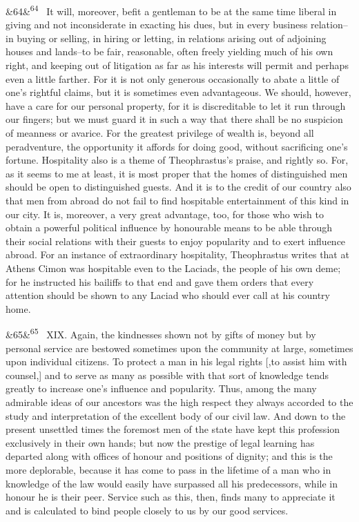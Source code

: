 \documentclass[12pt]{article}
\newcommand{\para}[1][]{\par\noindent\ifx&#1&\else\textsuperscript{\footnotesize #1}~\fi}
\begin{document}
\para[64] It will, moreover, befit a gentleman to be at the same time liberal in giving and not inconsiderate in exacting his dues, but in every business relation--in buying or selling, in hiring or letting, in relations arising out of adjoining houses and lands--to be fair, reasonable, often freely yielding much of his own right, and keeping out of litigation as far as his interests will permit and perhaps even a little farther. For it is not only generous occasionally to abate a little of one's rightful claims, but it is sometimes even advantageous. We should, however, have a care for our personal property, for it is discreditable to let it run through our fingers; but we must guard it in such a way that there shall be no suspicion of meanness or avarice. For the greatest privilege of wealth is, beyond all peradventure, the opportunity it affords for doing good, without sacrificing one's fortune. Hospitality also is a theme of Theophrastus's praise, and rightly so. For, as it seems to me at least, it is most proper that the homes of distinguished men should be open to distinguished guests. And it is to the credit of our country also that men from abroad do not fail to find hospitable entertainment of this kind in our city. It is, moreover, a very great advantage, too, for those who wish to obtain a powerful political influence by honourable means to be able through their social relations with their guests to enjoy popularity and to exert influence abroad. For an instance of extraordinary hospitality, Theophrastus writes that at Athens Cimon was hospitable even to the Laciads, the people of his own deme; for he instructed his bailiffs to that end and gave them orders that every attention should be shown to any Laciad who should ever call at his country home.

\para[65] XIX. Again, the kindnesses shown not by gifts of money but by personal service are bestowed sometimes upon the community at large, sometimes upon individual citizens. To protect a man in his legal rights [,to assist him with counsel,] and to serve as many as possible with that sort of knowledge tends greatly to increase one's influence and popularity. Thus, among the many admirable ideas of our ancestors was the high respect they always accorded to the study and interpretation of the excellent body of our civil law. And down to the present unsettled times the foremost men of the state have kept this profession exclusively in their own hands; but now the prestige of legal learning has departed along with offices of honour and positions of dignity; and this is the more deplorable, because it has come to pass in the lifetime of a man who in knowledge of the law would easily have surpassed all his predecessors, while in honour he is their peer. Service such as this, then, finds many to appreciate it and is calculated to bind people closely to us by our good services.
\end{document}

